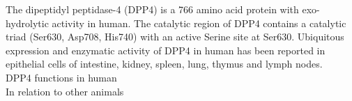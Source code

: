 The dipeptidyl peptidase-4 (DPP4) is a 766 amino acid protein with exo-hydrolytic activity in human. The catalytic region of DPP4 contains a catalytic triad (Ser630, Asp708, His740) with an active Serine site at Ser630. Ubiquitous expression and enzymatic activity of DPP4 in human has been reported in epithelial cells of intestine, kidney, spleen, lung, thymus and lymph nodes. 
\\
DPP4 functions in human 
\\ 
In relation to other animals 

